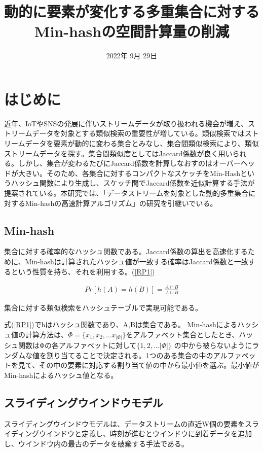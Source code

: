 \documentclass{interim} %
\date{2022年 9月 29日}
\title{動的に要素が変化する多重集合に対するMin-hashの空間計算量の削減}
\begin{document}
\maketitle

\section{はじめに}
近年、IoTやSNSの発展に伴いストリームデータが取り扱われる機会が増え、ストリームデータを対象とする類似検索の重要性が増している。類似検索ではストリームデータを要素が動的に変わる集合とみなし、集合間類似検索により、類似ストリームデータを探す。集合間類似度としてはJaccard係数が良く用いられる。しかし、集合が変わるたびにJaccard係数を計算しなおすのはオーバーヘッドが大きい。そのため、各集合に対するコンパクトなスケッチをMin-Hashというハッシュ関数により生成し、スケッチ間でJaccard係数を近似計算する手法が提案されている。本研究では、「データストリームを対象とした動的多重集合に対するMin-hashの高速計算アルゴリズム」の研究を引継いでいる。\cite{RP}

\subsection{Min-hash}
集合に対する確率的なハッシュ関数である。Jaccard係数の算出を高速化するために、Min-hashは計算されたハッシュ値が一致する確率はJaccard係数と一致するという性質を持ち、それを利用する。(\ref{RP1})

\begin{eqnarray}
	\label{RP1}
	Pr[h(A)=h(B)]=\frac{A\cap	B}{A\cup B}
\end{eqnarray}

集合に対する類似検索をハッシュテーブルで実現可能である。

式(\ref{RP1})でhはハッシュ関数であり、A,Bは集合である。
Min-hashによるハッシュ値の計算方法は、$Φ=\{x_1,x_2,…x_{|Φ|}\}$をアルファベット集合としたとき、ハッシュ関数はΦの各アルファベットに対して$\{1,2,…|Φ|\}$ の中から被らないようにランダムな値を割り当てることで決定される。1つのある集合の中のアルファベットを見て、その中の要素に対応する割り当て値の中から最小値を選ぶ。最小値がMin-hashによるハッシュ値となる。

\subsection{スライディングウインドウモデル}
スライディングウインドウモデルは、データストリームの直近W個の要素をスライディングウインドウと定義し、時刻が進むとウインドウに到着データを追加し、ウインドウ内の最古のデータを破棄する手法である。
\end{document}
